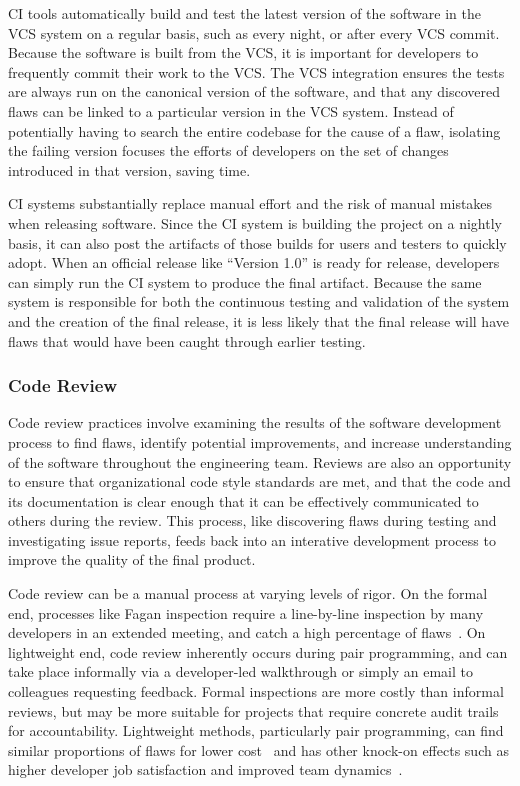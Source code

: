 CI tools automatically build and test the latest version of the
software in the VCS system on a regular basis, such as every night, or
after every VCS commit. Because the software is built from the VCS, it
is important for developers to frequently commit their work to the
VCS. The VCS integration ensures the tests are always run on the
canonical version of the software, and that any discovered flaws can
be linked to a particular version in the VCS system. Instead of
potentially having to search the entire codebase for the cause of a
flaw, isolating the failing version focuses the efforts of developers
on the set of changes introduced in that version, saving time.

CI systems substantially replace manual effort and the risk of manual
mistakes when releasing software. Since the CI system is building the
project on a nightly basis, it can also post the artifacts of those
builds for users and testers to quickly adopt. When an official
release like ``Version 1.0'' is ready for release, developers can
simply run the CI system to produce the final artifact. Because the
same system is responsible for both the continuous testing and
validation of the system and the creation of the final release, it is
less likely that the final release will have flaws that would have
been caught through earlier testing.

\subsubsection{Code Review}

Code review practices involve examining the results of the software
development process to find flaws, identify potential improvements,
and increase understanding of the software throughout the engineering
team. Reviews are also an opportunity to ensure that organizational
code style standards are met, and that the code and its documentation
is clear enough that it can be effectively communicated to others
during the review. This process, like discovering flaws during
testing and investigating issue reports, feeds back into an interative
development process to improve the quality of the final product.

Code review can be a manual process at varying levels of rigor. On the
formal end, processes like Fagan inspection require a line-by-line
inspection by many developers in an extended meeting, and catch a high
percentage of flaws~\cite{fagan2002design}. On lightweight end, code
review inherently occurs during pair programming, and can take place
informally via a developer-led walkthrough or simply an email to
colleagues requesting feedback. Formal inspections are more costly
than informal reviews, but may be more suitable for projects that
require concrete audit trails for accountability. Lightweight methods,
particularly pair programming, can find similar proportions of flaws
for lower cost~\cite{tomayko2002comparison} and has other knock-on
effects such as higher developer job satisfaction and improved team
dynamics~\cite{cockburn2000costs}.

